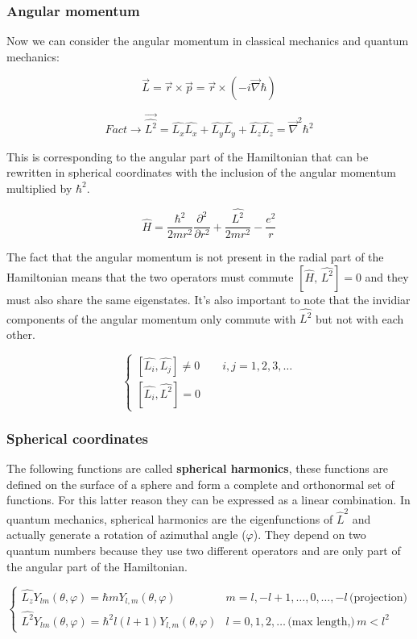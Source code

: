  		\subsubsection{Angular momentum}
		Now we can consider the angular momentum in classical mechanics and quantum mechanics:

		$$\vec{L}=\vec{r}\times\vec{p}=\vec{r}\times(-i\vec{\nabla}\hbar)$$


		$$\textit{Fact} \rightarrow \vec{\hat{L^2}}=\hat{L_x}\hat{L_x}+\hat{L_y}\hat{L_y}+\hat{L_z}\hat{L_z}=\vec{\nabla}^2\hbar^2$$

		This is corresponding to the angular part of the Hamiltonian that can be rewritten in spherical coordinates with the inclusion of the angular momentum multiplied by $\hbar^2$.

		$$\hat{H}=\frac{\hbar^2}{2mr^2}\frac{\partial^2}{\partial r^2}+\frac{\hat{L^2}}{2mr^2}-\frac{e^2}{r}$$

		The fact that the angular momentum is not present in the radial part of the Hamiltonian means that the two operators must commute $[\hat{H},\,\hat{L^2}]=0$ and they must also share the same eigenstates.
		It's also important to note that the invidiar components of the angular momentum only commute with $\hat{L^2}$ but not with each other.

		$$\begin{cases}[\hat{L_i},\hat{L_j}]\neq0 \qquad i,j=1, 2, 3, \dots \\ [\hat{L_i},\hat{L^2}]=0\end{cases}$$

		\subsubsection{Spherical coordinates}
		The following functions are called \textbf{spherical harmonics}, these functions are defined on the surface of a sphere and form a complete and orthonormal set of functions.
		For this latter reason they can be expressed as a linear combination.
		In quantum mechanics, spherical harmonics are the eigenfunctions of $\hat{L}^2$ and actually generate a rotation of azimuthal angle ($\varphi$).
		They depend on two quantum numbers because they use two different operators and are only part of the angular part of the Hamiltonian.

		$$\begin{cases}\hat{L_z}Y_{lm}(\theta,\varphi)=\hbar mY_{l,m}(\theta,\varphi) & m = l, -l+1,\dots, 0,\dots, -l \,\text{(projection)}\\ \hat{L^2}Y_{lm}(\theta,\varphi)=\hbar^2 l(l+1)Y_{l,m}(\theta,\varphi) & l = 0, 1, 2, \dots\,\text{(max length,)}\, m < l^2\end{cases}$$

